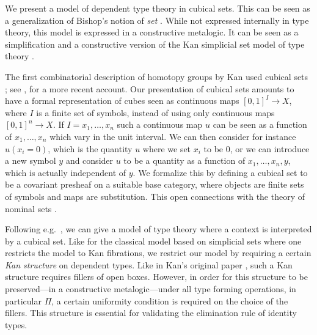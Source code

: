\documentclass[a4paper,USenglish,draft]{lipics}
\begin{document}
We present a model of dependent type theory in cubical sets.  This can
be seen as a generalization of Bishop's notion of {\em set}
\cite{Bishop}.  While not expressed internally in type theory, this
model is expressed in a constructive metalogic.  It can be seen as a
simplification and a constructive version of the Kan simplicial set
model of type theory \cite{Voevodsky}.


The first combinatorial description of homotopy groups by Kan used
cubical sets \cite{Kan}; see \cite{Crans}, \cite{Williamson} for a
more recent account.  Our presentation of cubical sets amounts to have
a formal representation of cubes seen as continuous maps
$[0,1]^I\rightarrow X$, where $I$ is a finite set of symbols, instead
of using only continuous maps $[0,1]^n\rightarrow X$. If $I =
x_1,\dots,x_n$ such a continuous map $u$ can be seen as a function of
$x_1,\dots,x_n$ which vary in the unit interval. We can then consider
for instance $u(x_i=0)$, which is the quantity $u$ where we set $x_i$
to be $0$, or we can introduce a new symbol $y$ and consider $u$ to be
a quantity as a function of $x_1,\dots,x_n,y$, which is actually
independent of $y$. We formalize this by defining a cubical set to be
a covariant presheaf on a suitable base category, where objects are
finite sets of symbols and maps are substitution. This open
connections with the theory of nominal sets \cite{pitts,Pitts}.




 Following e.g.\ \cite{Hofmann}, we can give a model of type theory
where a context is interpreted by a cubical set.
Like for the classical model based on simplicial sets
where one restricts the model to Kan fibrations, we restrict our model
by requiring a certain \emph{Kan structure} on dependent types.  Like
in Kan's original paper \cite{Kan}, such
a Kan structure requires fillers of open boxes.  However, in order for this
structure to be preserved---in a constructive metalogic---under all
type forming operations, in particular $\Pi$, a certain uniformity
condition is required on the choice of the fillers. This structure is
essential for validating the elimination rule of identity types.
\end{document}
